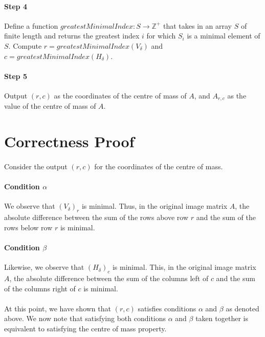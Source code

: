 \documentclass[]{article}
\begin{document}
		\paragraph{Step 4}
		Define a function $greatestMinimalIndex: S \to \mathbb{Z}^+$ that takes in an array $S$ of finite length and returns the greatest index $i$ for which $S_i$ is a minimal element of $S$. Compute $r = greatestMinimalIndex(V_\delta)$ and $c = greatestMinimalIndex(H_\delta)$.
		
		\paragraph{Step 5}
		Output $(r,c)$ as the coordinates of the centre of mass of $A$, and $A_{r,c}$ as the value of the centre of mass of $A$.
			
	
	\section{Correctness Proof}
		\paragraph{}
		Consider the output $(r,c)$ for the coordinates of the centre of mass. 
		
		\paragraph{Condition $\alpha$}
		We observe that $(V_\delta)_r$ is minimal. Thus, in the original image matrix $A$, the absolute difference between the sum of the rows above row $r$ and the sum of the rows below row $r$ is minimal.
		
		\paragraph{Condition $\beta$}
		Likewise, we observe that $(H_\delta)_c$ is minimal. This, in the original image matrix $A$, the absolute difference between the sum of the columns left of $c$ and the sum of the columns right of $c$ is minimal.
		
		\paragraph{}
		At this point, we have shown that $(r,c)$ satisfies conditions $\alpha$ and $\beta$ as denoted above. We now note that satisfying both conditions $\alpha$ and $\beta$ taken together is equivalent to satisfying the centre of mass property.
		
\end{document}
